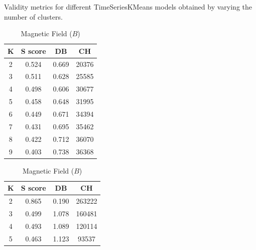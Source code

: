 \begin{table}[]
    \caption[Validity Scores for TimeSeriesKmeans]{Validity metrics for different TimeSeriesKMeans models obtained by varying the number of clusters.}
    \begin{subtable}[h]{0.48\textwidth}
        \centering
        \begin{tabular}{@{}cccc@{}}
            \toprule
            \textbf{K} & \textbf{S score} & \textbf{DB} & \textbf{CH} \\ \midrule
            2          & 0.524               & 0.669                   & 20376                  \\
            3          & 0.511               & 0.628                   & 25585                  \\
            4          & 0.498               & 0.606                   & 30677                  \\
            5          & 0.458               & 0.648                   & 31995                  \\
            6          & 0.449               & 0.671                   & 34394                  \\
            7          & 0.431               & 0.695                   & 35462                  \\
            8          & 0.422               & 0.712                   & 36070                  \\
            9          & 0.403               & 0.738                   & 36368                  \\ \bottomrule
        \end{tabular}
        \caption{Magnetic Field ($B$)}
        \label{tab:tskmeans_b}
    \end{subtable}
    \hfill
    \begin{subtable}[h]{0.48\textwidth}
        \centering
        \begin{tabular}{@{}cccc@{}}
            \toprule
            \textbf{K} & \textbf{S score} & \textbf{DB} & \textbf{CH} \\ \midrule
            2          & 0.865               & 0.190                   & 263222                 \\
            3          & 0.499               & 1.078                   & 160481                 \\
            4          & 0.493               & 1.089                   & 120114                 \\
            5          & 0.463               & 1.123                   & 93537                  \\

\end{tabular}
\end{subtable}
\end{table}
